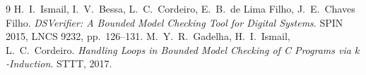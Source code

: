 \documentclass[12pt,a4paper]{article}
\begin{document}
\newpage

\begin{thebibliography}{9}
 H.~I.~Ismail, I.~V.~Bessa, L.~C.~Cordeiro, E.~B.~de Lima Filho,
  J.~E.~Chaves Filho. \emph{DSVerifier: A Bounded Model Checking Tool for Digital Systems}.
  SPIN 2015, LNCS 9232, pp.~126--131.
 M.~Y.~R.~Gadelha, H.~I.~Ismail, L.~C.~Cordeiro. \emph{Handling Loops in
  Bounded Model Checking of C Programs via $k$-Induction}. STTT, 2017.
\end{thebibliography}
\end{document}
